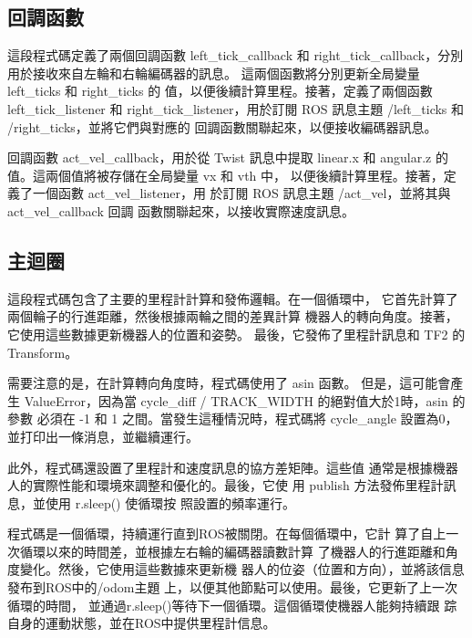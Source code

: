 \subsection{回調函數}
這段程式碼定義了兩個回調函數 left\_tick\_callback 和
right\_tick\_callback，分別用於接收來自左輪和右輪編碼器的訊息。
這兩個函數將分別更新全局變量 left\_ticks 和 right\_ticks 的
值，以便後續計算里程。接著，定義了兩個函數 
left\_tick\_listener 和 right\_tick\_listener，用於訂閱 ROS
訊息主題 /left\_ticks 和 /right\_ticks，並將它們與對應的
回調函數關聯起來，以便接收編碼器訊息。

回調函數 act\_vel\_callback，用於從 Twist 訊息中提取 linear.x
和 angular.z 的值。這兩個值將被存儲在全局變量 vx 和 vth 中，
以便後續計算里程。接著，定義了一個函數 act\_vel\_listener，用
於訂閱 ROS 訊息主題 /act\_vel，並將其與 act\_vel\_callback 回調
函數關聯起來，以接收實際速度訊息。

\subsection{主迴圈}

這段程式碼包含了主要的里程計計算和發佈邏輯。在一個循環中，
它首先計算了兩個輪子的行進距離，然後根據兩輪之間的差異計算
機器人的轉向角度。接著，它使用這些數據更新機器人的位置和姿勢。
最後，它發佈了里程計訊息和 TF2 的 Transform。

需要注意的是，在計算轉向角度時，程式碼使用了 asin 函數。
但是，這可能會產生 ValueError，因為當 
cycle\_diff / TRACK\_WIDTH 的絕對值大於1時，asin 的參數
必須在 -1 和 1 之間。當發生這種情況時，程式碼將 
cycle\_angle 設置為0，並打印出一條消息，並繼續運行。

此外，程式碼還設置了里程計和速度訊息的協方差矩陣。這些值
通常是根據機器人的實際性能和環境來調整和優化的。最後，它使
用 publish 方法發佈里程計訊息，並使用 r.sleep() 使循環按
照設置的頻率運行。

程式碼是一個循環，持續運行直到ROS被關閉。在每個循環中，它計
算了自上一次循環以來的時間差，並根據左右輪的編碼器讀數計算
了機器人的行進距離和角度變化。然後，它使用這些數據來更新機
器人的位姿（位置和方向），並將該信息發布到ROS中的/odom主題
上，以便其他節點可以使用。最後，它更新了上一次循環的時間，
並通過r.sleep()等待下一個循環。這個循環使機器人能夠持續跟
踪自身的運動狀態，並在ROS中提供里程計信息。

